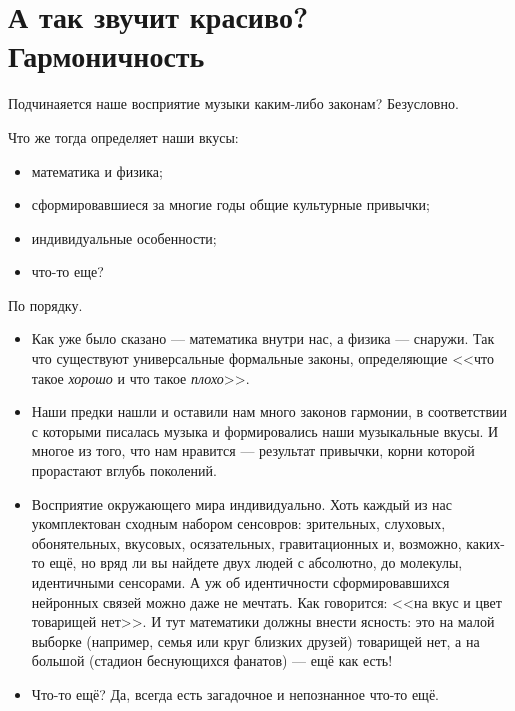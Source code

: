 \chapter{А так звучит красиво? Гармоничность}
\label{ch:harmony}


Подчинаяется наше восприятие музыки каким-либо законам? Безусловно.

Что же тогда определяет наши вкусы:
\begin{itemize}
    \item математика и физика;
    \item сформировавшиеся за многие годы общие культурные привычки;
    \item индивидуальные особенности;
    \item что-то еще?
\end{itemize}

По порядку.
\begin{itemize}
    \item Как уже было сказано --- математика внутри нас, а физика --- снаружи. Так что существуют универсальные формальные законы, определяющие <<что такое \emph{хорошо} и что такое \emph{плохо}>>.
    \item Наши предки нашли и оставили нам много законов гармонии, в соответствии с которыми писалась музыка и формировались наши музыкальные вкусы. И многое из того, что нам нравится --- результат привычки, корни которой прорастают вглубь поколений.
    \item Восприятие окружающего мира индивидуально. Хоть каждый из нас укомплектован сходным набором сенсовров: зрительных, слуховых, обонятельных, вкусовых, осязательных, гравитационных и, возможно, каких-то ещё, но вряд ли вы найдете двух людей с абсолютно, до молекулы, идентичными сенсорами. А уж об идентичности сформировавшихся нейронных связей можно даже не мечтать. Как говорится: <<на вкус и цвет товарищей нет>>. И тут математики должны внести ясность: это на малой выборке (например, семья или круг близких друзей) товарищей нет, а на большой (стадион беснующихся фанатов) --- ещё как есть!
    \item Что-то ещё? Да, всегда есть загадочное и непознанное что-то ещё.
\end{itemize}







